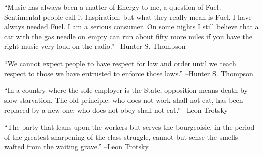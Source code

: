 \documentclass{article}%
\begin{document}
\linebreak%
\vspace{1mm}%
\begin{minipage}{\textwidth}%
\flushleft%
“Music has always been a matter of Energy to me, a question of Fuel. Sentimental people call it Inspiration, but what they really mean is Fuel. I have always needed Fuel. I am a serious consumer. On some nights I still believe that a car with the gas needle on empty can run about fifty more miles if you have the right music very loud on the radio.”%
\linebreak%
\vspace{1mm}%
–Hunter S. Thompson%
\linebreak%
\vspace{1mm}%
\end{minipage}%
\linebreak%
\vspace{1mm}%
\begin{minipage}{\textwidth}%
\flushleft%
“We cannot expect people to have respect for law and order until we teach respect to those we have entrusted to enforce those laws.”%
\linebreak%
\vspace{1mm}%
–Hunter S. Thompson%
\linebreak%
\vspace{1mm}%
\end{minipage}%
\linebreak%
\vspace{1mm}%
\begin{minipage}{\textwidth}%
\flushleft%
“In a country where the sole employer is the State, opposition means death by slow starvation. The old principle: who does not work shall not eat, has been replaced by a new one: who does not obey shall not eat.”%
\linebreak%
\vspace{1mm}%
–Leon Trotsky%
\linebreak%
\vspace{1mm}%
\end{minipage}%
\linebreak%
\vspace{1mm}%
\begin{minipage}{\textwidth}%
\flushleft%
“The party that leans upon the workers but serves the bourgeoisie, in the period of the greatest sharpening of the class struggle, cannot but sense the smells wafted from the waiting grave.”%
\linebreak%
\vspace{1mm}%
–Leon Trotsky%
\linebreak%
\vspace{1mm}%
\end{minipage}%
\end{document}
